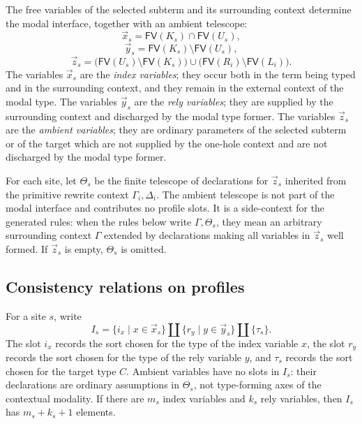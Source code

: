 \documentclass[11pt]{article}
\newcommand{\FV}{\mathsf{FV}}
\begin{document}
The free variables of the selected subterm and its surrounding context determine
the modal interface, together with an ambient telescope:
\[
  \vec{x}_s
  =
  \FV(K_s)\cap\FV(U_s),
\]
\[
  \vec{y}_s
  =
  \FV(K_s)\setminus\FV(U_s),
\]
\[
  \vec{z}_s
  =
  \bigl(\FV(U_s)\setminus\FV(K_s)\bigr)
  \cup
  \bigl(\FV(R_i)\setminus\FV(L_i)\bigr).
\]
The variables \(\vec{x}_s\) are the \emph{index variables}; they occur both in
the term being typed and in the surrounding context, and they remain in the
external context of the modal type.  The variables \(\vec{y}_s\) are the
\emph{rely variables}; they are supplied by the surrounding context and
discharged by the modal type former.  The variables \(\vec{z}_s\) are the
\emph{ambient variables}; they are ordinary parameters of the selected subterm or
of the target which are not supplied by the one-hole context and are not
discharged by the modal type former.

For each site, let \(\Theta_s\) be the finite telescope of declarations for
\(\vec{z}_s\) inherited from the primitive rewrite context
\(\Gamma_i,\Delta_i\).  The ambient telescope is not part of the modal interface
and contributes no profile slots.  It is a side-context for the generated rules:
when the rules below write \(\Gamma,\Theta_s\), they mean an arbitrary surrounding
context \(\Gamma\) extended by declarations making all variables in \(\vec{z}_s\)
well formed.  If \(\vec{z}_s\) is empty, \(\Theta_s\) is omitted.

\subsection{Consistency relations on profiles}

For a site \(s\), write
\[
  I_s
  =
  \{i_x\mid x\in\vec{x}_s\}
  \amalg
  \{r_y\mid y\in\vec{y}_s\}
  \amalg
  \{\tau_s\}.
\]
The slot \(i_x\) records the sort chosen for the type of the index variable
\(x\), the slot \(r_y\) records the sort chosen for the type of the rely
variable \(y\), and \(\tau_s\) records the sort chosen for the target type
\(C\).  Ambient variables have no slots in \(I_s\): their declarations are
ordinary assumptions in \(\Theta_s\), not type-forming axes of the contextual
modality.  If there are \(m_s\) index variables and \(k_s\) rely variables, then
\(I_s\) has \(m_s+k_s+1\) elements.
\end{document}
